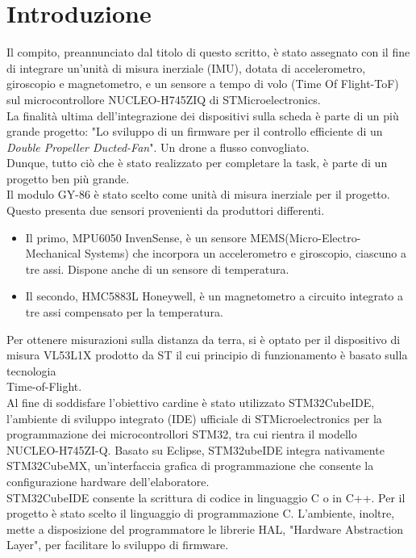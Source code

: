 \chapter{Introduzione}
Il compito, preannunciato dal titolo di questo scritto, è stato assegnato con il fine di integrare un'unità di misura inerziale (IMU), dotata di accelerometro, giroscopio e magnetometro, e un sensore a tempo di volo (Time Of Flight-ToF) sul microcontrollore  NUCLEO-H745ZIQ di STMicroelectronics.\\
La finalità ultima dell'integrazione dei dispositivi sulla scheda è parte di un più grande progetto: "Lo sviluppo di un firmware per il controllo efficiente di un \textit{Double Propeller Ducted-Fan}". Un drone a flusso convogliato.\\
Dunque, tutto ciò che è stato realizzato per completare la task, è parte di un progetto ben più grande.\\
Il modulo GY-86 è stato scelto come unità di misura inerziale per il progetto. Questo presenta due sensori provenienti da produttori differenti. 
\begin{itemize}
    \item Il primo, MPU6050 InvenSense, è un sensore MEMS(Micro-Electro-Mechanical Systems) che incorpora un accelerometro e giroscopio, ciascuno a tre assi. Dispone anche di un sensore di temperatura.\\
    \item Il secondo, HMC5883L Honeywell, è un magnetometro a circuito integrato a tre assi compensato per la temperatura. 
\end{itemize}
Per ottenere misurazioni sulla distanza da terra, si è optato per il dispositivo di misura VL53L1X prodotto da ST il cui principio di funzionamento è basato sulla tecnologia \\Time-of-Flight.\\
Al fine di soddisfare l'obiettivo cardine  è stato utilizzato STM32CubeIDE, l'ambiente di sviluppo integrato (IDE) ufficiale di STMicroelectronics per la programmazione dei microcontrollori STM32, tra cui rientra il modello  NUCLEO-H745ZI-Q. 
Basato su Eclipse, STM32ubeIDE integra nativamente STM32CubeMX, un'interfaccia grafica di programmazione che consente la configurazione hardware dell'elaboratore.\\
STM32CubeIDE consente la scrittura di codice in linguaggio C o in C++. Per il progetto è stato scelto il linguaggio di programmazione C.
L'ambiente, inoltre, mette a disposizione del programmatore le librerie HAL, "Hardware Abstraction Layer", per facilitare lo sviluppo di firmware.\\

